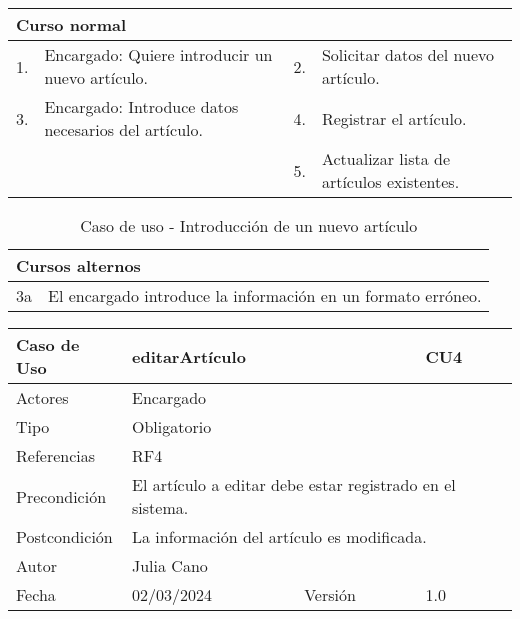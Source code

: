 \begin{table}[H]
	\centering
	\begin{tabular}{| m{} | m{} | m{} | m{} |}
		\hline
		\multicolumn{4}{|m{0.9\textwidth}|}{Curso normal}     \\ 
		\hline
		1. & Encargado: Quiere introducir un nuevo artículo. & 2. &  Solicitar datos del nuevo artículo.  \\ 
		\hline
		3. & Encargado: Introduce datos necesarios del artículo. & 4. & Registrar el artículo. \\ 
		\hline
		&  & 5. & Actualizar lista de artículos existentes. \\ 
		\hline
	\end{tabular}
\end{table}

\begin{table}[H]
	\centering
	\begin{tabular}{| m{} | m{} | m{} | m{} |}
		\hline
		\multicolumn{4}{|m{0.9\textwidth}|}{Cursos alternos}     \\ 
		\hline
		3a & \multicolumn{3}{m{0.67\textwidth}|}{El encargado introduce la información en un formato erróneo.} \\ 
		\hline
	\end{tabular}
	\caption{Caso de uso - Introducción de un nuevo artículo}
\end{table}

\newpage


\begin{table}[H]
	\centering
	\begin{tabular}{| m{} | m{} | m{} | m{} |}
		\hline
		\rowcolor{grayshade} Caso de Uso & \multicolumn{2}{|m{0.43\textwidth}|}{editarArtículo} &  CU4\\ 
		\hline
		Actores & \multicolumn{3}{l|}{Encargado} \\ 
		\hline
		Tipo & \multicolumn{3}{l|}{Obligatorio} \\ 
		\hline
		Referencias & \multicolumn{3}{l|}{RF4} \\ 
		\hline
		Precondición & \multicolumn{3}{m{0.67\textwidth}|}{El artículo a editar debe estar registrado en el sistema.} \\ 
		\hline
		Postcondición & \multicolumn{3}{l|}{La información del artículo es modificada.} \\ 
		\hline
		Autor & \multicolumn{3}{l|}{Julia Cano} \\ 
		\hline
		Fecha & 02/03/2024 & Versión & 1.0 \\
		\hline
	\end{tabular}
\end{table}

